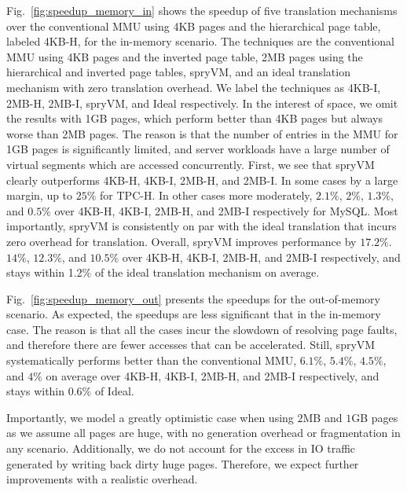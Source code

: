 Fig.~\ref{fig:speedup_memory_in} shows the speedup of five translation mechanisms over the conventional MMU using 4KB pages and the hierarchical page table, labeled 4KB-H, for the in-memory scenario. The techniques are the conventional MMU using 4KB pages and the inverted page table, 2MB pages using the hierarchical and inverted page tables, spryVM, and an ideal translation mechanism with zero translation overhead. We label the techniques as 4KB-I, 2MB-H, 2MB-I, spryVM, and Ideal respectively. In the interest of space, we omit the results with 1GB pages, which perform better than 4KB pages but always worse than 2MB pages. The reason is that the number of entries in the MMU for 1GB pages is significantly limited, and server workloads have a large number of virtual segments which are accessed concurrently. First, we see that spryVM clearly outperforms 4KB-H, 4KB-I, 2MB-H, and 2MB-I. In some cases by a large margin, up to $25\%$ for TPC-H. In other cases more moderately, $2.1\%$, $2\%$, $1.3\%$, and $0.5\%$ over 4KB-H, 4KB-I, 2MB-H, and 2MB-I respectively for MySQL. Most importantly, spryVM is consistently on par with the ideal translation that incurs zero overhead for translation. Overall, spryVM improves performance by $17.2\%$. $14\%$, $12.3\%$, and $10.5\%$ over 4KB-H, 4KB-I, 2MB-H, and 2MB-I respectively, and stays within 1.2\% of the ideal translation mechanism on average.

Fig.~\ref{fig:speedup_memory_out} presents the speedups for the out-of-memory scenario. As expected, the speedups are less significant that in the in-memory case. The reason is that all the cases incur the slowdown of resolving page faults, and therefore there are fewer accesses that can be accelerated. Still, spryVM systematically performs better than the conventional MMU, $6.1\%$, $5.4\%$, $4.5\%$, and $4\%$ on average over 4KB-H, 4KB-I, 2MB-H, and 2MB-I respectively, and stays within 0.6\% of Ideal. 

Importantly, we model a greatly optimistic case when using $2$MB and $1$GB pages as we assume all pages are huge, with no generation overhead or fragmentation in any scenario. Additionally, we do not account for the excess in IO traffic generated by writing back dirty huge pages. Therefore, we expect further improvements with a realistic overhead. 



